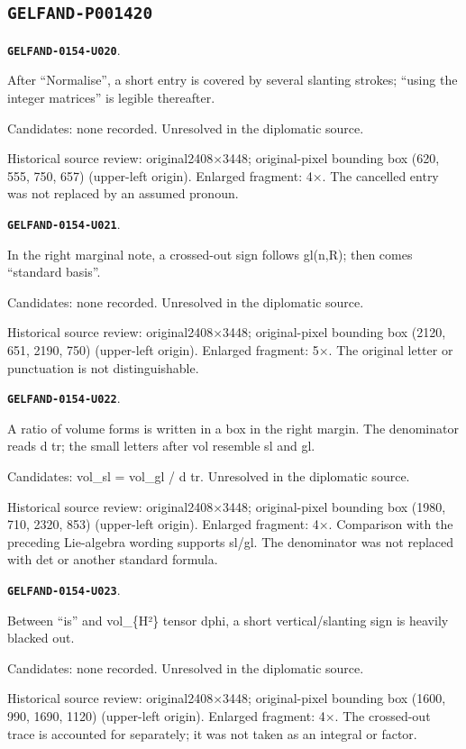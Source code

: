 \documentclass[11pt]{article}
\theoremstyle{definition}
\theoremstyle{remark}
\begin{document}
\subsection*{\texttt{GELFAND-P001420}}
\par\noindent\leavevmode{}\label{GELFAND-0154-U020}\label{GELFAND-P001420:normalization-cancelled:note}\textbf{\texttt{GELFAND-0154-U020}}.\nopagebreak[4]\par
After “Normalise”, a short entry is covered by several slanting strokes; “using the integer matrices” is legible thereafter.\par
Candidates: none recorded. Unresolved in the diplomatic source.\par
Historical source review: original2408×3448; original-pixel bounding box (620, 555, 750, 657) (upper-left origin). Enlarged fragment: 4×. The cancelled entry was not replaced by an assumed pronoun.\par\medskip
\par\noindent\leavevmode{}\label{GELFAND-0154-U021}\label{GELFAND-P001420:margin-cancelled:note}\textbf{\texttt{GELFAND-0154-U021}}.\nopagebreak[4]\par
In the right marginal note, a crossed-out sign follows gl(n,R); then comes “standard basis”.\par
Candidates: none recorded. Unresolved in the diplomatic source.\par
Historical source review: original2408×3448; original-pixel bounding box (2120, 651, 2190, 750) (upper-left origin). Enlarged fragment: 5×. The original letter or punctuation is not distinguishable.\par\medskip
\par\noindent\leavevmode{}\label{GELFAND-0154-U022}\label{GELFAND-P001420:margin-volume-formula:note}\textbf{\texttt{GELFAND-0154-U022}}.\nopagebreak[4]\par
A ratio of volume forms is written in a box in the right margin. The denominator reads d tr; the small letters after vol resemble sl and gl.\par
Candidates: vol\_sl = vol\_gl / d tr. Unresolved in the diplomatic source.\par
Historical source review: original2408×3448; original-pixel bounding box (1980, 710, 2320, 853) (upper-left origin). Enlarged fragment: 4×. Comparison with the preceding Lie-algebra wording supports sl/gl. The denominator was not replaced with det or another standard formula.\par\medskip
\par\noindent\leavevmode{}\label{GELFAND-0154-U023}\label{GELFAND-P001420:invariant-volume-cancelled:note}\textbf{\texttt{GELFAND-0154-U023}}.\nopagebreak[4]\par
Between “is” and vol\_\{H²\} tensor dphi, a short vertical/slanting sign is heavily blacked out.\par
Candidates: none recorded. Unresolved in the diplomatic source.\par
Historical source review: original2408×3448; original-pixel bounding box (1600, 990, 1690, 1120) (upper-left origin). Enlarged fragment: 4×. The crossed-out trace is accounted for separately; it was not taken as an integral or factor.\par\medskip
\end{document}
